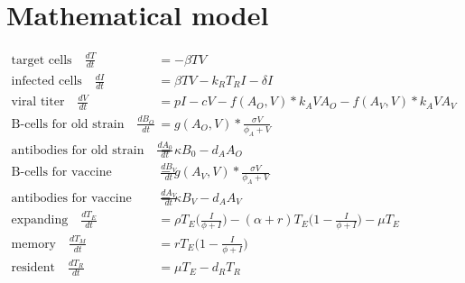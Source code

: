 \documentclass[11pt]{article}
\newcommand{\ddt}[1]{\frac{d#1}{dt}}
\begin{document}
%
%

\section{Mathematical model}
\begin{align}
\mbox{target cells}\quad    \ddt{T} &= -\beta TV\\
\mbox{infected cells}\quad    \ddt{I} &= \beta TV -k_RT_{R}I - \delta I\\
\mbox{viral titer}\quad    \ddt{V} &= pI - cV - f(A_O, V)*k_A V A_O - f(A_V, V)*k_A V A_V\\
\mbox{B-cells for old strain}\quad \ddt{B_O} &= g(A_O, V)*\frac{\sigma V }{\phi_{A} + V} \\
\mbox{antibodies for old strain}\quad    \ddt{A_0} &= \kappa B_0 - d_{A}A_O \\
\mbox{B-cells for vaccine strain}\quad \ddt{B_V} &= g(A_V, V)*\frac{\sigma V }{\phi_{A} + V} \\
\mbox{antibodies for vaccine strain}\quad    \ddt{A_V} &= \kappa B_V - d_{A}A_V\\
\mbox{expanding}\quad    \ddt{T_{E}} &= \rho T_{E}\Big(\frac{I}{\phi + I}\Big) - (\alpha + r)T_{E}\Big(1 - \frac{I}{\phi + I}\Big) - \mu T_{E}\\
\mbox{memory}\quad    \ddt{T_{M}} &= rT_{E}\Big(1 - \frac{I}{\phi+I}\Big)\\
\mbox{resident}\quad    \ddt{T_{R}} &= \mu  T_{E}   - d_R  T_{R}
\end{align}
\end{document}
